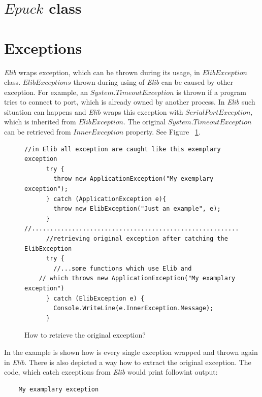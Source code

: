 \documentclass[12pt,notitlepage]{report}
\begin{document}
\chapter*{$Epuck$ class}

\chapter*{Exceptions}
	{\it Elib} wraps exception, which can be thrown during its usage, in $ ElibException$ class.
	$ElibExceptions$ thrown during using of {\it Elib} can be caused by other exception.
	For example, an $System.TimeoutException$ is thrown if a program tries to connect to port, 
	which is already owned by another process.
	In {\it Elib} such situation can happens and {\it Elib} wraps this exception
	with $SerialPortException$, which is inherited from $ElibException$.
	The original $System.TimeoutException$ can be retrieved from $InnerException$ property.
	See Figure ~\ref{exceptionuse}.
\begin{figure}[!hbp]
\begin{lstlisting}
//in Elib all exception are caught like this exemplary exception
      try {
        throw new ApplicationException("My exemplary exception");
      } catch (ApplicationException e){
        throw new ElibException("Just an example", e);
      }
//........................................................................
      //retrieving original exception after catching the ElibException
      try {
        //...some functions which use Elib and 
	// which throws new ApplicationException("My examplary exception")
      } catch (ElibException e) {
        Console.WriteLine(e.InnerException.Message);
      }
\end{lstlisting}
\caption{How to retrieve the original exception?}
\label{exceptionuse}
\end{figure}
	In the example is shown how is every single exception wrapped and thrown again in {\it Elib}.
	There is also depicted a way how to extract the original exception.
	The code, which catch exceptions from {\it Elib} would print followint output:
\begin{verbatim}
	My examplary exception
\end{verbatim}
\end{document}
